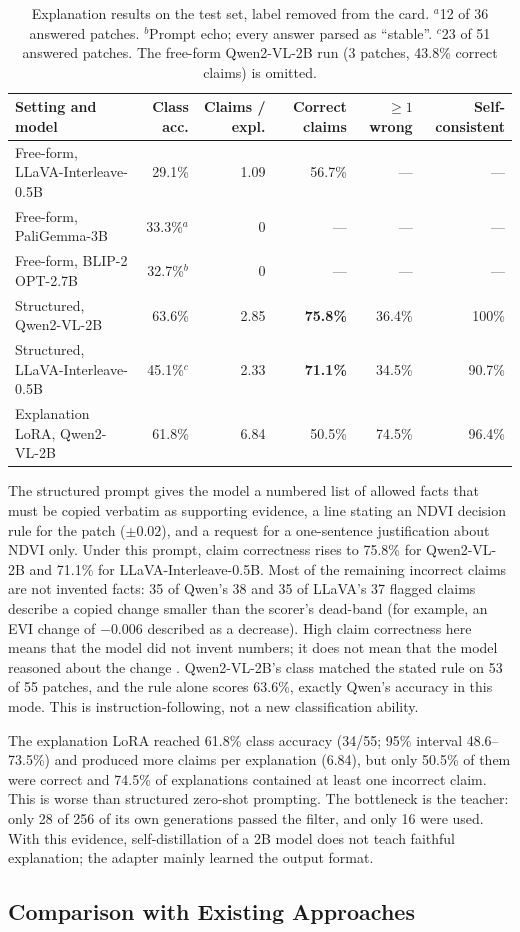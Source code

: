 \begin{table}[t]
\centering
\small
\begin{tabular}{lrrrrr}
\toprule
Setting and model & Class acc. & Claims / expl. & Correct claims & $\ge 1$ wrong & Self-consistent \\
\midrule
Free-form, LLaVA-Interleave-0.5B & 29.1\% & 1.09 & 56.7\% & --- & --- \\
Free-form, PaliGemma-3B & 33.3\%$^{a}$ & 0 & --- & --- & --- \\
Free-form, BLIP-2 OPT-2.7B & 32.7\%$^{b}$ & 0 & --- & --- & --- \\
\midrule
Structured, Qwen2-VL-2B & 63.6\% & 2.85 & \textbf{75.8\%} & 36.4\% & 100\% \\
Structured, LLaVA-Interleave-0.5B & 45.1\%$^{c}$ & 2.33 & \textbf{71.1\%} & 34.5\% & 90.7\% \\
\midrule
Explanation LoRA, Qwen2-VL-2B & 61.8\% & 6.84 & 50.5\% & 74.5\% & 96.4\% \\
\bottomrule
\end{tabular}
\caption{Explanation results on the test set, label removed from the
card. $^{a}$12 of 36 answered patches. $^{b}$Prompt echo; every answer
parsed as ``stable''. $^{c}$23 of 51 answered patches. The free-form
Qwen2-VL-2B run (3 patches, 43.8\% correct claims) is omitted.}
\label{tab:explain}
\end{table}

The structured prompt gives the model a numbered list of allowed facts
that must be copied verbatim as supporting evidence, a line stating an
NDVI decision rule for the patch ($\pm 0.02$), and a request for a
one-sentence justification about NDVI only. Under this prompt, claim
correctness rises to 75.8\% for Qwen2-VL-2B and 71.1\% for
LLaVA-Interleave-0.5B. Most of the remaining incorrect claims are not
invented facts: 35 of Qwen's 38 and 35 of LLaVA's 37 flagged claims
describe a copied change smaller than the scorer's dead-band (for
example, an EVI change of $-0.006$ described as a decrease). High claim
correctness here means that the model did not invent numbers; it does
not mean that the model reasoned about the change
. Qwen2-VL-2B's class matched the stated
rule on 53 of 55 patches, and the rule alone scores 63.6\%, exactly
Qwen's accuracy in this mode. This is instruction-following, not a new
classification ability.

The explanation LoRA reached 61.8\% class accuracy (34/55; 95\% interval
48.6--73.5\%) and produced more claims per explanation (6.84), but only
50.5\% of them were correct and 74.5\% of explanations contained at
least one incorrect claim. This is worse than structured zero-shot
prompting. The bottleneck is the teacher: only 28 of 256 of its own
generations passed the filter, and only 16 were used. With this
evidence, self-distillation of a 2B model does not teach faithful
explanation; the adapter mainly learned the output format.

\subsection{Comparison with Existing Approaches}
